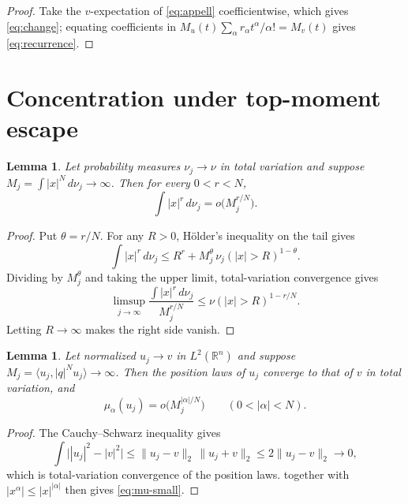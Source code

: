 \documentclass[11pt,reqno]{amsart}
\theoremstyle{plain}
\newtheorem{lemma}[theorem]{Lemma}
\theoremstyle{definition}
\theoremstyle{remark}
\numberwithin{equation}{section}
\begin{document}
\begin{proof}
  Take the $v$-expectation of \eqref{eq:appell} coefficientwise, which gives
  \eqref{eq:change}; equating coefficients in
  $M_u(t)\sum_\alpha r_\alpha t^\alpha/\alpha!=M_v(t)$ gives
  \eqref{eq:recurrence}.
\end{proof}

\section{Concentration under top-moment escape}
\label{sec:concentration}

\begin{lemma}
  \label{lem:measure}
  Let probability measures $\nu_j\to\nu$ in total variation and suppose
  $M_j=\int|x|^N\,d\nu_j\to\infty$. Then for every $0<r<N$,
  \begin{equation}
    \label{eq:lower-moments}
    \int|x|^r\,d\nu_j=o\bigl(M_j^{r/N}\bigr).
  \end{equation}
\end{lemma}

\begin{proof}
  Put $\theta=r/N$. For any $R>0$, Hölder's inequality on the tail gives
  \begin{equation*}
    \int|x|^r\,d\nu_j\le R^r+M_j^{\theta}\,\nu_j(|x|>R)^{1-\theta}.
  \end{equation*}
  Dividing by $M_j^{\theta}$ and taking the upper limit, total-variation
  convergence gives
  \begin{equation*}
    \limsup_{j\to\infty}\frac{\int|x|^r\,d\nu_j}{M_j^{r/N}}
    \le\nu(|x|>R)^{1-r/N}.
  \end{equation*}
  Letting $R\to\infty$ makes the right side vanish.
\end{proof}

\begin{lemma}
  \label{lem:tv}
  Let normalized $u_j\to v$ in $L^2(\mathbb R^n)$ and suppose
  $M_j=\langle u_j,|q|^Nu_j\rangle\to\infty$. Then the position laws of
  $u_j$ converge to that of $v$ in total variation, and
  \begin{equation}
    \label{eq:mu-small}
    \mu_\alpha(u_j)=o\bigl(M_j^{|\alpha|/N}\bigr)
    \qquad(0<|\alpha|<N).
  \end{equation}
\end{lemma}

\begin{proof}
  The Cauchy--Schwarz inequality gives
  \begin{equation}
    \label{eq:tv-bound}
    \int\bigl||u_j|^2-|v|^2\bigr|
    \le\lVert u_j-v\rVert_2\,\lVert u_j+v\rVert_2
    \le2\lVert u_j-v\rVert_2\longrightarrow0,
  \end{equation}
  which is total-variation convergence of the position laws.
   together with $|x^\alpha|\le|x|^{|\alpha|}$ then gives
  \eqref{eq:mu-small}.
\end{proof}
\end{document}
